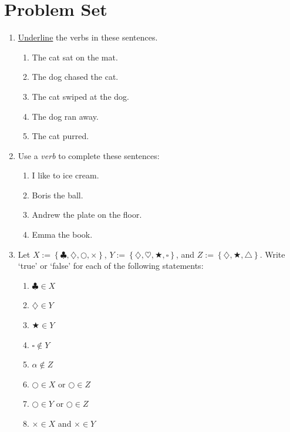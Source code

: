 \documentclass{tufte-book}
\begin{document}
\clearpage\section{Problem Set }

\begin{enumerate}
  \item \underline{Underline} the verbs in these sentences.
  \begin{enumerate}
    \item The cat sat on the mat.
    \item The dog chased the cat.
    \item The cat swiped at the dog.
    \item The dog ran away.
    \item The cat purred.
  \end{enumerate}

  \item Use a \emph{verb} to complete these sentences:\bigskip
  \begin{enumerate}
    \item I like to \dotfill\bigskip ice cream.
    \item Boris \dotfill\bigskip the ball.
    \item Andrew \dotfill\bigskip the plate on the floor.
    \item Emma \dotfill\bigskip the book.
  \end{enumerate}

  \item Let $X := \left\{\clubsuit, \diamondsuit, \bigcirc, \times\right\}$, $Y := \left\{\diamondsuit, \heartsuit, \bigstar, \square\right\}$, and $Z := \left\{\diamondsuit, \bigstar, \triangle\right\}$. 
  Write `true' or `false' for each of the following statements:
  \begin{multicols}{2}
  \begin{enumerate}
    \item $\clubsuit \in X$ \dotfill\bigskip
    \item $\diamondsuit \in Y$ \dotfill\bigskip
    \item $\bigstar \in Y$ \dotfill\bigskip
    \item $\square \notin Y$ \dotfill
    \item $\alpha \notin Z$ \dotfill\bigskip
    \item $\bigcirc \in X$ or $\bigcirc \in Z$ \dotfill\bigskip
    \item $\bigcirc \in Y$ or $\bigcirc \in Z$ \dotfill\bigskip
    \item $\times \in X$ and $\times \in Y$ \dotfill
  \end{enumerate}
  \end{multicols}


\end{enumerate}
\end{document}
